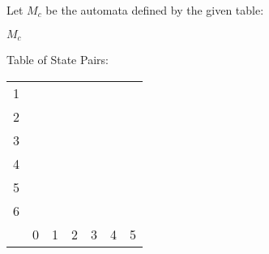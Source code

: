 Let $M_c$ be the automata defined by the given table:
\begin{automata}{$M_c$}
	
	
	
	
	
	
	
	
	
\end{automata}

Table of State Pairs:
\begin{center} \begin{tabular}{*{7}{c|}}
									\cline{1-2}
	1 &                       \\	\cline{1-3}
	2 &   &                   \\	\cline{1-4}
	3 &   &   &               \\	\cline{1-5}
	4 &   &   &   &           \\	\cline{1-6}
	5 &   &   &   &   &       \\	\hline
	6 &   &   &   &   &   &   \\	\hline
	  & 0 & 1 & 2 & 3 & 4 & 5 \\	\hline
\end{tabular} \end{center}